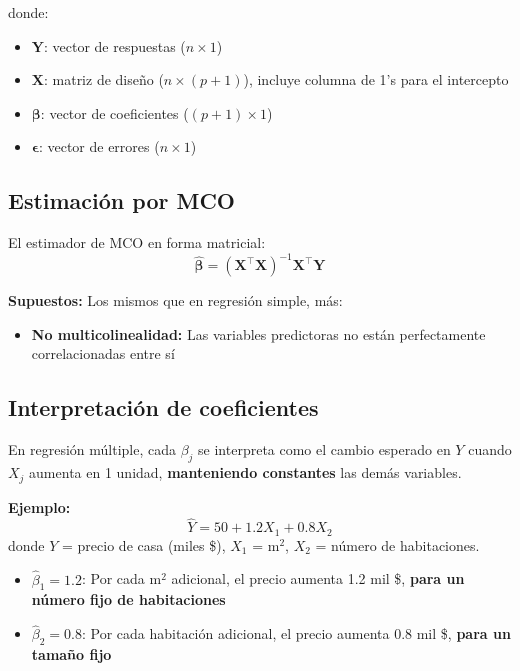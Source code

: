 \documentclass[11pt,a4paper]{article}
\begin{document}
donde:
\begin{itemize}
    \item $\mathbf{Y}$: vector de respuestas ($n \times 1$)
    \item $\mathbf{X}$: matriz de diseño ($n \times (p+1)$), incluye columna de 1's para el intercepto
    \item $\boldsymbol{\beta}$: vector de coeficientes ($(p+1) \times 1$)
    \item $\boldsymbol{\epsilon}$: vector de errores ($n \times 1$)
\end{itemize}

\subsection{Estimación por MCO}

El estimador de MCO en forma matricial:
\begin{equation}
\hat{\boldsymbol{\beta}} = (\mathbf{X}^\top \mathbf{X})^{-1} \mathbf{X}^\top \mathbf{Y}
\end{equation}

\textbf{Supuestos:} Los mismos que en regresión simple, más:
\begin{itemize}
    \item \textbf{No multicolinealidad:} Las variables predictoras no están perfectamente correlacionadas entre sí
\end{itemize}

\subsection{Interpretación de coeficientes}

En regresión múltiple, cada $\beta_j$ se interpreta como el cambio esperado en $Y$ cuando $X_j$ aumenta en 1 unidad, \textbf{manteniendo constantes} las demás variables.

\textbf{Ejemplo:}
\[
\hat{Y} = 50 + 1.2 X_1 + 0.8 X_2
\]
donde $Y$ = precio de casa (miles \$), $X_1$ = m$^2$, $X_2$ = número de habitaciones.

\begin{itemize}
    \item $\hat{\beta}_1 = 1.2$: Por cada m$^2$ adicional, el precio aumenta 1.2 mil \$, \textbf{para un número fijo de habitaciones}
    \item $\hat{\beta}_2 = 0.8$: Por cada habitación adicional, el precio aumenta 0.8 mil \$, \textbf{para un tamaño fijo}
\end{itemize}
\end{document}
